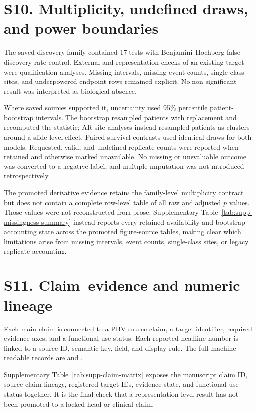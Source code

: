 \section*{S10. Multiplicity, undefined draws, and power boundaries}

The saved discovery family contained 17 tests with Benjamini--Hochberg false-discovery-rate
control. External and representation checks of an existing target were qualification
analyses. Missing intervals, missing event counts, single-class sites, and underpowered
endpoint rows remained explicit. No non-significant result was interpreted as biological
absence.

Where saved sources supported it, uncertainty used 95\% percentile patient-bootstrap
intervals. The bootstrap resampled patients with replacement and recomputed the statistic;
AR site analyses instead resampled patients as clusters around a slide-level effect. Paired
survival contrasts used identical draws for both models. Requested, valid, and undefined
replicate counts were reported when retained and otherwise marked unavailable. No missing
or unevaluable outcome was converted to a negative label, and multiple imputation was not
introduced retrospectively.

The promoted derivative evidence retains the family-level multiplicity contract but does not
contain a complete row-level table of all raw and adjusted $p$ values. Those values were not
reconstructed from prose. Supplementary Table~\ref{tab:supp-missingness-summary} instead reports every
retained availability and bootstrap-accounting state across the promoted figure-source
tables, making clear which limitations arise from missing intervals, event counts,
single-class sites, or legacy replicate accounting.




\section*{S11. Claim--evidence and numeric lineage}

Each main claim is connected to a PBV source claim, a target identifier, required evidence
axes, and a functional-use status. Each reported headline number is linked to a source ID,
semantic key, field, and display rule. The full machine-readable records are
 and
.

Supplementary Table~\ref{tab:supp-claim-matrix} exposes the manuscript claim ID, source-claim lineage,
registered target IDs, evidence state, and functional-use status together. It is the final
check that a representation-level result has not been promoted to a locked-head or clinical
claim.

